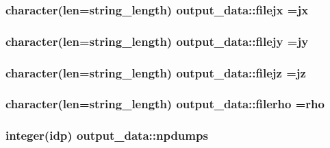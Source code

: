 \subsubsection[{\texorpdfstring{filejx}{filejx}}]{\setlength{\rightskip}{0pt plus 5cm}character(len=string\+\_\+length) output\+\_\+data\+::filejx =\textquotesingle{}jx\textquotesingle{}}\hypertarget{namespaceoutput__data_a1e0f229429f07c107635c7844afa8d39}{}\label{namespaceoutput__data_a1e0f229429f07c107635c7844afa8d39}
\subsubsection[{\texorpdfstring{filejy}{filejy}}]{\setlength{\rightskip}{0pt plus 5cm}character(len=string\+\_\+length) output\+\_\+data\+::filejy =\textquotesingle{}jy\textquotesingle{}}\hypertarget{namespaceoutput__data_afaf1fb3c71c81a246f6af6ca881610ec}{}\label{namespaceoutput__data_afaf1fb3c71c81a246f6af6ca881610ec}
\subsubsection[{\texorpdfstring{filejz}{filejz}}]{\setlength{\rightskip}{0pt plus 5cm}character(len=string\+\_\+length) output\+\_\+data\+::filejz =\textquotesingle{}jz\textquotesingle{}}\hypertarget{namespaceoutput__data_a3656388605a302a6fc4c579fe82eb10b}{}\label{namespaceoutput__data_a3656388605a302a6fc4c579fe82eb10b}
\subsubsection[{\texorpdfstring{filerho}{filerho}}]{\setlength{\rightskip}{0pt plus 5cm}character(len=string\+\_\+length) output\+\_\+data\+::filerho =\textquotesingle{}rho\textquotesingle{}}\hypertarget{namespaceoutput__data_abd9468ccde074971628171196a7873f2}{}\label{namespaceoutput__data_abd9468ccde074971628171196a7873f2}
\subsubsection[{\texorpdfstring{npdumps}{npdumps}}]{\setlength{\rightskip}{0pt plus 5cm}integer(idp) output\+\_\+data\+::npdumps}\hypertarget{namespaceoutput__data_a4dbfde333a6a2225527c27d33472032e}{}\label{namespaceoutput__data_a4dbfde333a6a2225527c27d33472032e}
